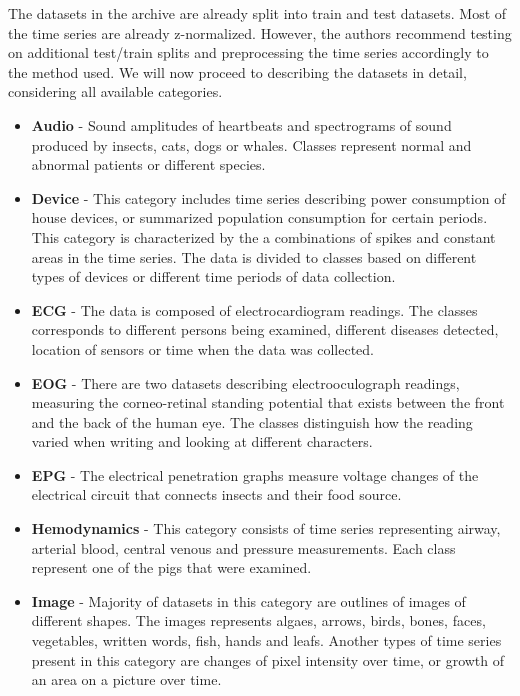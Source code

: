 \documentclass[a4paper,11pt,twoside]{report}
\theoremstyle{definition}
\begin{document}
The datasets in the archive are already split into train and test datasets.  Most of the time series are already z-normalized.  However, the authors recommend testing on additional test/train splits and preprocessing the time series accordingly to the method used.  We will now proceed to describing the datasets in detail, considering all available categories.

\begin{itemize}
\item \textbf{Audio} - Sound amplitudes of heartbeats and spectrograms of sound produced by insects, cats, dogs or whales. Classes represent normal and abnormal patients or different species.

\item \textbf{Device} - This category includes time series describing power consumption of house devices, or summarized population consumption for certain periods. This category is characterized by the a combinations of spikes and constant areas in the time series. The data is divided to classes based on different types of devices or different time periods of data collection.

\item \textbf{ECG} - The data is composed of electrocardiogram readings. The classes corresponds to different persons being examined, different diseases detected, location of sensors or time when the data was collected.

\item \textbf{EOG} - There are two datasets describing electrooculograph readings, measuring the corneo-retinal standing potential that exists between the front and the back of the human eye. The classes distinguish how the reading varied when writing and looking at different characters.
\item \textbf{EPG} - The electrical penetration graphs measure voltage changes of the electrical circuit that connects insects and their food source.
\item \textbf{Hemodynamics} - This category consists of time series representing airway, arterial blood, central venous and pressure measurements. Each class represent one of the pigs that were examined.

\item \textbf{Image} - Majority of datasets in this category are outlines of images of different shapes. The images represents algaes, arrows, birds, bones, faces, vegetables, written words, fish, hands and leafs. Another types of time series present in this category are changes of pixel intensity over time, or growth of an area on a picture over time.


\end{itemize}
\end{document}
